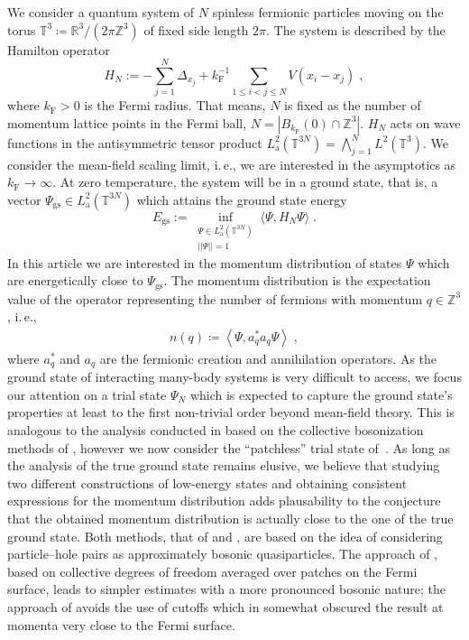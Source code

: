\documentclass[12pt,a4paper]{article}
\numberwithin{equation}{section}
\newcommand{\Zbb}{\mathbb{Z}}
\newcommand{\1}{\mathbb{I}}
\newcommand{\F}{\mathrm{F}}
\newcommand{\GS}{\mathrm{gs}}
\newcommand{\Rbb}{\mathbb{R}}
\newcommand{\Z}{\mathbb{Z}}
\newcommand{\T}{\mathbb{T}}
\newcommand{\eva}[1]{\left\langle #1 \right\rangle}
\theoremstyle{plain}
\theoremstyle{definition}
\theoremstyle{remark}
\theoremstyle{plain}
\theoremstyle{definition}
\theoremstyle{remark}
\begin{document}
We consider a quantum system of $N$ spinless fermionic particles moving on the torus $\mathbb{T}^3\coloneq \Rbb^3/ (2\pi \Zbb^3)$ of fixed side length $2\pi$. The system is described by the Hamilton operator
\begin{equation}
	H_N := - \sum_{j=1}^{N}\Delta_{x_j} + k_{\F}^{-1} \sum_{1\leq i < j \leq N } V(x_i - x_j) \;,
\end{equation}
where $ k_{\F} > 0 $ is the Fermi radius. That means, $ N $ is fixed as the number of momentum lattice points in the Fermi ball, $ N = |B_{k_{\F}}(0) \cap \Z^3| $. $ H_N $ acts on wave functions in the antisymmetric tensor product $L^2_{\mathrm{a}}(\T^{3N}) = \bigwedge_{j=1}^N L^2(\T^3)$.
We consider the mean-field scaling limit, i.\,e., we are interested in the asymptotics as $k_{\F} \to \infty$.
At zero temperature, the system will be in a ground state, that is, a vector $ \Psi_{\GS} \in L^2_{\mathrm{a}}(\T^{3N}) $ which attains the ground state energy
\begin{equation} \label{eq:EGS}
	E_{\GS}
	:= \inf_{\substack{\Psi \in L^2_{\mathrm{a}}(\T^{3N}) \\||\Psi|| = 1}} \langle \Psi, H_N \Psi \rangle \;.
\end{equation}
In this article we are interested in the momentum distribution of states $ \Psi $ which are energetically close to $ \Psi_{\GS} $. The momentum distribution is the expectation value of the operator representing the number of fermions with momentum $q \in \Zbb^3$, i.\,e.,
\begin{align}
	n(q) \coloneq \eva{\Psi, a^*_q a_q \Psi} \;,
\end{align}
where $ a_q^*$ and $a_q $ are the fermionic creation and annihilation operators. As the ground state of interacting many-body systems is very difficult to access, we focus our attention on a trial state $ \Psi_N $ which is expected to capture the ground state's properties at least to the first non-trivial order beyond mean-field theory. This is analogous to the analysis conducted in \cite{BL25} based on the collective bosonization methods of \cite{BNPSS20,BNPSS21}, however we now consider the ``patchless'' trial state of~\cite{CHN23}. As long as the analysis of the true ground state remains elusive, we believe that studying two different constructions of low-energy states and obtaining consistent expressions for the momentum distribution adds plausability to the conjecture that the obtained momentum distribution is actually close to the one of the true ground state. Both methods, that of \cite{BL25} and \cite{CHN23}, are based on the idea of considering particle--hole pairs as approximately bosonic quasiparticles. The approach of \cite{BNPSS20,BNPSS21}, based on collective degrees of freedom averaged over patches on the Fermi surface, leads to simpler estimates with a more pronounced bosonic nature; the approach of \cite{CHN23} avoids the use of cutoffs which in \cite{BL25} somewhat obscured the result at momenta very close to the Fermi surface.
\end{document}
